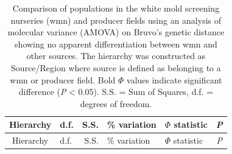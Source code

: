 \documentclass[fleqn,10pt,lineno]{wlpeerj} %
\theoremstyle{definition}
\theoremstyle{definition}
\theoremstyle{definition}
\theoremstyle{remark}
\begin{document}
\begin{longtable}[]{@{}clrllc@{}}
\caption{\label{tab:amova} Comparison of populations in the white mold
screening nurseries (wmn) and producer fields using an analysis of
molecular variance (AMOVA) on Bruvo's genetic distance showing no
apparent differentiation between wmn and other sources. The hierarchy
was constructed as Source/Region where source is defined as belonging to
a wmn or producer field. Bold \(\Phi\) values indicate significant
difference (\emph{P} \textless{} 0.05). S.S. = Sum of Squares, d.f. =
degrees of freedom.}\tabularnewline
\toprule
\begin{minipage}[b]{0.32\columnwidth}\centering\strut
Hierarchy\strut
\end{minipage} & \begin{minipage}[b]{0.06\columnwidth}\raggedright\strut
d.f.\strut
\end{minipage} & \begin{minipage}[b]{0.07\columnwidth}\raggedleft\strut
S.S.\strut
\end{minipage} & \begin{minipage}[b]{0.13\columnwidth}\raggedright\strut
\% variation\strut
\end{minipage} & \begin{minipage}[b]{0.19\columnwidth}\raggedright\strut
\(\Phi\) statistic\strut
\end{minipage} & \begin{minipage}[b]{0.07\columnwidth}\centering\strut
\emph{P}\strut
\end{minipage}\tabularnewline
\midrule
\endfirsthead
\toprule
\begin{minipage}[b]{0.32\columnwidth}\centering\strut
Hierarchy\strut
\end{minipage} & \begin{minipage}[b]{0.06\columnwidth}\raggedright\strut
d.f.\strut
\end{minipage} & \begin{minipage}[b]{0.07\columnwidth}\raggedleft\strut
S.S.\strut
\end{minipage} & \begin{minipage}[b]{0.13\columnwidth}\raggedright\strut
\% variation\strut
\end{minipage} & \begin{minipage}[b]{0.19\columnwidth}\raggedright\strut
\(\Phi\) statistic\strut
\end{minipage} & \begin{minipage}[b]{0.07\columnwidth}\centering\strut
\emph{P}\strut

\end{minipage}
\end{longtable}
\end{document}
